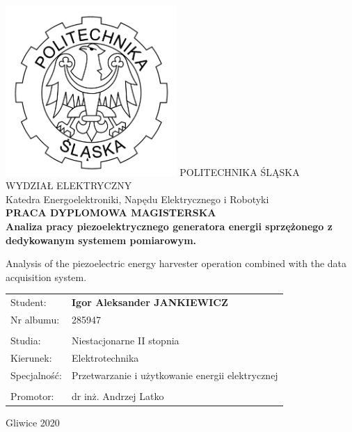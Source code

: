\documentclass[12pt,a4paper]{article}
\begin{document}
\begin{titlepage}
    \centering
    \includegraphics[width=6.5cm]{logo2.png} %
    \vskip1cm
    {\Large
        POLITECHNIKA ŚLĄSKA\\
        WYDZIAŁ ELEKTRYCZNY\\
        \vskip0.5cm
        Katedra Energoelektroniki, Napędu Elektrycznego i Robotyki\\
    }
    \vskip1cm
    {\bfseries\huge
    PRACA DYPLOMOWA MAGISTERSKA\\
    }
    \vskip0.5cm
    {\bfseries\large
    Analiza pracy piezoelektrycznego generatora energii sprzężonego z dedykowanym systemem pomiarowym. \\
    }

        \vskip0.5cm
    {\bfseries\normalsize
    
Analysis of the piezoelectric energy harvester operation combined with the data acquisition system. \\
    }
        \vskip 1.5cm
    {\large
    \begin{tabular}{p{4cm} p{10cm}}
    Student: & {\bfseries\Large Igor Aleksander JANKIEWICZ}\\
    Nr albumu: & 285947\\
        &   \\
    Studia: & Niestacjonarne II stopnia\\
    Kierunek: & Elektrotechnika\\
    Specjalność: & Przetwarzanie i użytkowanie energii elektrycznej\\
        &   \\
    Promotor: & dr inż. Andrzej Latko\\
    \end{tabular}
    }
    \vskip2cm
    {\large
    Gliwice 2020}
\end{titlepage}

\clearpage
\end{document}
